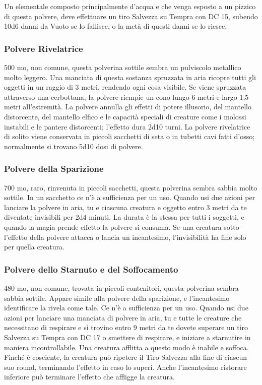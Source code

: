 \begin{multicols}{2}
Un elementale composto principalmente d'acqua e che venga esposto a un pizzico di questa polvere, deve effettuare un tiro Salvezza su Tempra con DC 15, subendo 10d6 danni da Vuoto se lo fallisce, o la metà di questi danni se lo riesce.

\subsubsection*{Polvere Rivelatrice}
500 mo, non comune, questa polverina sottile sembra un pulviscolo metallico molto leggero. Una manciata di questa sostanza spruzzata in aria ricopre tutti gli oggetti in un raggio di 3 metri, rendendo ogni cosa visibile. Se viene spruzzata attraverso una cerbottana, la polvere riempie un cono lungo 6 metri e largo 1,5 metri all’estremità. La polvere annulla gli effetti di potere illusorio, del mantello distorcente, del mantello elfico e le capacità speciali di creature come i molossi instabili e le pantere distorcenti; l’effetto dura 2d10 turni. La polvere rivelatrice di solito viene conservata in piccoli sacchetti di seta o in tubetti cavi fatti d’osso; normalmente si trovano 5d10 dosi di polvere.

\subsubsection*{Polvere della Sparizione}
700 mo, raro, rinvenuta in piccoli sacchetti, questa polverina sembra sabbia molto sottile. In un sacchetto ce n'è a sufficienza per un uso. Quando usi due azioni per lanciare la polvere in aria, tu e ciascuna creatura e oggetto entro 3 metri da te diventate invisibili per 2d4 minuti. La durata è la stessa per tutti i soggetti, e quando la magia prende effetto la polvere si consuma. Se una creatura sotto l'effetto della polvere attacca o lancia un incantesimo, l'invisibilità ha fine solo per quella creatura.

\subsubsection*{Polvere dello Starnuto e del Soffocamento}
480 mo, non comune, trovata in piccoli contenitori, questa polverina sembra sabbia sottile. Appare simile alla polvere della sparizione, e l'incantesimo identificare la rivela come tale. Ce n'è a sufficienza per un uso. Quando usi due azioni per lanciare una manciata di polvere in aria, tu e tutte le creature che necessitano di respirare e si trovino entro 9 metri da te dovete superare un tiro Salvezza su Tempra con DC 17 o smettere di respirare, e iniziare a starnutire in maniera incontrollabile. Una creatura afflitta a questo modo è inabile e soffoca. Finché è cosciente, la creatura può ripetere il Tiro Salvezza alla fine di ciascun suo round, terminando l'effetto in caso lo superi. Anche l'incantesimo ristorare inferiore può terminare l'effetto che affligge la creatura.


\end{multicols}
